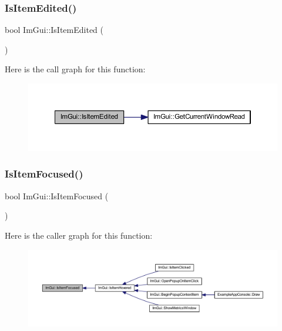 \subsubsection{\texorpdfstring{Is\+Item\+Edited()}{IsItemEdited()}}
{\footnotesize\ttfamily bool Im\+Gui\+::\+Is\+Item\+Edited (\begin{DoxyParamCaption}{ }\end{DoxyParamCaption})}

Here is the call graph for this function\+:
\nopagebreak
\begin{figure}[H]
\begin{center}
\leavevmode
\includegraphics[width=350pt]{namespace_im_gui_a6508c0e1f28d1e7f9328a944b4f35ff7_cgraph}
\end{center}
\end{figure}
\mbox{\label{namespace_im_gui_add3290865a67327258c3a32b695adb28}} 
\subsubsection{\texorpdfstring{Is\+Item\+Focused()}{IsItemFocused()}}
{\footnotesize\ttfamily bool Im\+Gui\+::\+Is\+Item\+Focused (\begin{DoxyParamCaption}{ }\end{DoxyParamCaption})}

Here is the caller graph for this function\+:
\nopagebreak
\begin{figure}[H]
\begin{center}
\leavevmode
\includegraphics[width=350pt]{namespace_im_gui_add3290865a67327258c3a32b695adb28_icgraph}
\end{center}
\end{figure}
\mbox{\label{namespace_im_gui_ac9a400eff3a9561d95e80486c52a660b}} 
